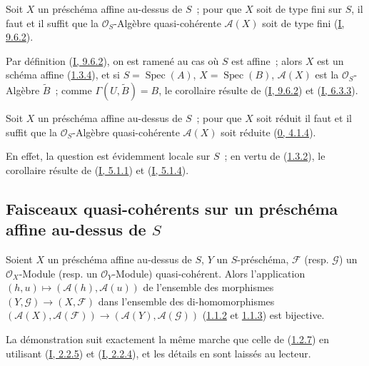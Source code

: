 \begin{corollary}[1.3.7]
\label{II.1.3.7-fr}
Soit $X$ un préschéma affine au-dessus de $S$~; pour que $X$ soit de type fini
sur $S$, il faut et il suffit que la $\mathcal{O}_S$-Algèbre quasi-cohérente
$\mathcal{A}(X)$ soit de type fini
(\hyperref[I.9.6.2-fr]{I, 9.6.2}).
\end{corollary}

Par définition (\hyperref[I.9.6.2-fr]{I, 9.6.2}), on est ramené au cas où
$S$ est affine~; alors $X$ est un schéma affine
(\hyperref[II.1.3.4-fr]{1.3.4}), et si $S=\operatorname{Spec}(A)$,
$X=\operatorname{Spec}(B)$, $\mathcal{A}(X)$ est la
$\mathcal{O}_S$-Algèbre $\widetilde{B}$~; comme
$\Gamma(U,\widetilde{B})=B$, le corollaire résulte de
(\hyperref[I.9.6.2-fr]{I, 9.6.2}) et
(\hyperref[I.6.3.3-fr]{I, 6.3.3}).

\begin{corollary}[1.3.8]
\label{II.1.3.8-fr}
Soit $X$ un préschéma affine au-dessus de $S$~; pour que $X$ soit réduit il
faut et il suffit que la $\mathcal{O}_S$-Algèbre quasi-cohérente
$\mathcal{A}(X)$ soit réduite
(\hyperref[0.4.1.4-fr]{0, 4.1.4}).
\end{corollary}

En effet, la question est évidemment locale sur $S$~; en vertu de
(\hyperref[II.1.3.2-fr]{1.3.2}), le corollaire résulte de
(\hyperref[I.5.1.1-fr]{I, 5.1.1}) et
(\hyperref[I.5.1.4-fr]{I, 5.1.4}).

\subsection{Faisceaux quasi-cohérents sur un préschéma affine au-dessus de
$S$}
\label{subsection:II.1.4-fr}

\begin{proposition}[1.4.1]
\label{II.1.4.1-fr}
Soient $X$ un préschéma affine au-dessus de $S$, $Y$ un $S$-préschéma,
$\mathcal{F}$ (resp. $\mathcal{G}$) un $\mathcal{O}_X$-Module (resp. un
$\mathcal{O}_Y$-Module) quasi-cohérent. Alors l'application
$(h,u)\mapsto(\mathcal{A}(h),\mathcal{A}(u))$ de l'ensemble des morphismes
$(Y,\mathcal{G})\to(X,\mathcal{F})$ dans l'ensemble des di-homomorphismes
$(\mathcal{A}(X),\mathcal{A}(\mathcal{F}))\to
(\mathcal{A}(Y),\mathcal{A}(\mathcal{G}))$
(\hyperref[II.1.1.2-fr]{1.1.2} et
\hyperref[II.1.1.3-fr]{1.1.3}) est bijective.
\end{proposition}

La démonstration suit exactement la même marche que celle de
(\hyperref[II.1.2.7-fr]{1.2.7}) en utilisant
(\hyperref[I.2.2.5-fr]{I, 2.2.5}) et
(\hyperref[I.2.2.4-fr]{I, 2.2.4}), et les détails en sont laissés au
lecteur.

